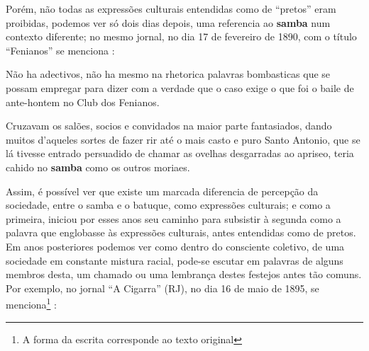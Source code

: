 Porém, não todas as expressões culturais entendidas como de ``pretos'' eram proibidas,
podemos ver só dois dias depois, uma referencia ao \textbf{samba} num contexto diferente; 
no mesmo jornal, 
no dia 17 de fevereiro de 1890, com o título ``Fenianos''
se menciona \cite[pp. 1]{batuqueperiodicogazetanoticias2}:
\begin{citando}%
Não ha adectivos, não ha mesmo na 
rhetorica palavras bombasticas que se 
possam empregar para dizer com a
verdade que o caso exige o que foi o baile
de ante-hontem no Club dos Fenianos.

Cruzavam os salões, socios e convidados
na maior parte fantasiados, dando
muitos d'aqueles sortes de fazer rir até
o mais casto e puro Santo Antonio, que se
lá tivesse entrado persuadido de chamar
as ovelhas desgarradas ao apriseo, teria
cahido no \textbf{samba} como os outros moriaes.
\end{citando}%
Assim, é possível ver que existe um marcada diferencia de percepção da sociedade, entre o samba e o batuque,
como expressões culturais; e como a primeira, 
iniciou por esses anos seu caminho para subsistir à segunda como a palavra que englobasse às
expressões culturais, antes entendidas como de pretos. 
Em anos posteriores podemos ver como dentro do consciente coletivo, 
de uma sociedade em constante mistura racial, 
pode-se escutar em palavras de alguns membros desta,
um chamado ou uma lembrança destes festejos antes tão comuns.
Por exemplo, no jornal ``A Cigarra'' (RJ), 
no dia 16 de maio de 1895, se menciona\footnote{\label{footort4}A forma da escrita corresponde ao texto original} \cite[pp. 2]{batuqueperiodicoacigarra}:
